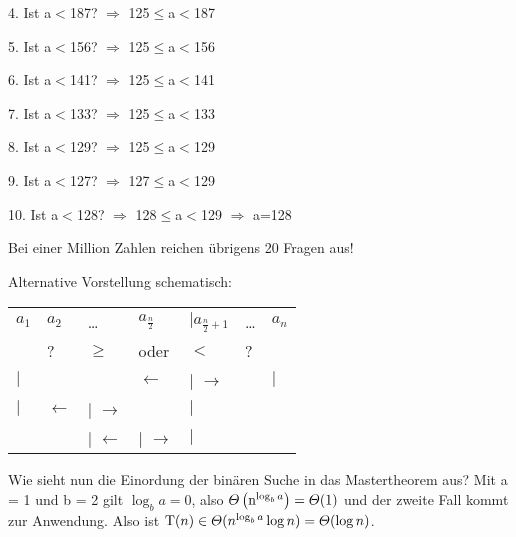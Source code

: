 \documentclass[ngerman,draft,parskip=half*,twoside]{scrreprt}
\theoremstyle{break}
\begin{document}
4. Ist a$<$187? $\Rightarrow$ 125$\leq$a$<$187

5. Ist a$<$156? $\Rightarrow$ 125$\leq$a$<$156

6. Ist a$<$141? $\Rightarrow$ 125$\leq$a$<$141

7. Ist a$<$133? $\Rightarrow$ 125$\leq$a$<$133

8. Ist a$<$129? $\Rightarrow$ 125$\leq$a$<$129

9. Ist a$<$127? $\Rightarrow$ 127$\leq$a$<$129

10. Ist a$<$128? $\Rightarrow$ 128$\leq$a$<$129 $\Rightarrow$ a=128 

Bei einer Million Zahlen reichen übrigens 20 Fragen aus!
\bigskip

% 
Alternative Vorstellung schematisch:

\begin{tabular}{lllllll}
$a_1$     & $a_2$           & \dots   &  \( a_{\frac{n}{2}}\) & \( \vert a_{\frac{n}{2}+1}\) & \dots  & $a_n$ \\
          &       ?         & $\geq$  & oder                  & $<$                          &  ?     &\\
$\vert$   &                 &         & $\gets$               & $\vert$ $\to$                &        & $\vert$\\
$\vert$   & $\gets$ & $\vert$ $\to$ & & $\vert$\\
&         & $\vert$ $\gets$ & $\vert$ $\to$ & $\vert$
\end{tabular}
\bigskip

Wie sieht nun die Einordung der binären Suche in das Mastertheorem aus?
Mit a = 1 und b = 2 gilt \(\log_ba = 0\), also \(\Theta\left(\textup{n}^{\log_ba}\right)=\Theta(1)\) und der zweite Fall kommt zur Anwendung.
Also ist \(  \textup{T}(n) \in \Theta(n^{\log_ba}\log n)=\Theta(\log n) \).
\end{document}
